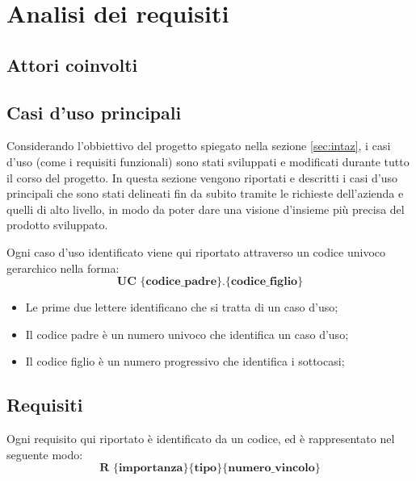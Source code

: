 
\chapter{Analisi dei requisiti}\label{chap:requirements}

\section{Attori coinvolti}
\section{Casi d'uso principali}
Considerando l'obbiettivo del progetto spiegato nella sezione \ref{sec:intaz}, i casi d'uso (come i requisiti funzionali) sono stati sviluppati e modificati durante tutto il corso del progetto. In questa sezione vengono riportati e descritti i casi d'uso principali che sono stati delineati fin da subito tramite le richieste dell'azienda e quelli di alto livello, in modo da poter dare una visione d’insieme più precisa del prodotto sviluppato.

Ogni caso d'uso identificato viene qui riportato attraverso un codice univoco gerarchico nella forma:
$$ \textbf{UC \{codice\_padre\}.\{codice\_figlio\}  } $$
\begin{itemize}
	\item Le prime due lettere identificano che si tratta di un caso d'uso;
	\item Il codice padre è un numero univoco che identifica un caso d'uso;
	\item Il codice figlio è un numero progressivo che identifica i sottocasi;\\
\end{itemize}



\section{Requisiti}
Ogni requisito qui riportato è identificato da un codice, ed è rappresentato nel seguente modo:
$$ \textbf{R \{importanza\}\{tipo\}\{numero\_vincolo\} } $$

